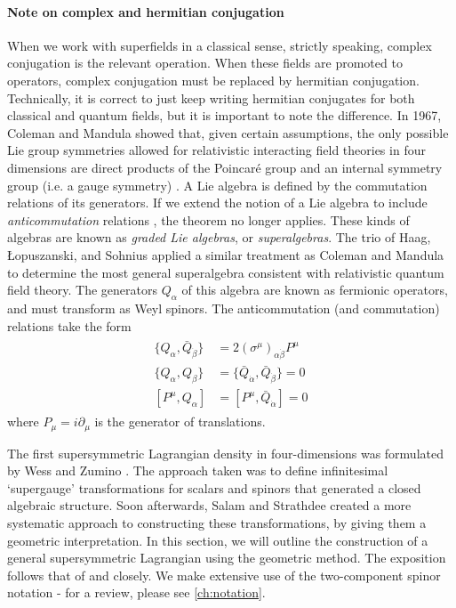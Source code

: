 \paragraph{Note on complex and hermitian conjugation} When we work with superfields in a classical sense, strictly speaking, complex conjugation is the relevant operation. When these fields are promoted to operators, complex conjugation must be replaced by hermitian conjugation. Technically, it is correct to just keep writing hermitian conjugates for both classical and quantum fields, but it is important to note the difference.
In 1967, Coleman and Mandula \citep{Coleman1967} showed that, given certain assumptions, the only possible Lie group symmetries allowed for relativistic interacting field theories in four dimensions are direct products of the Poincar\'e group and an internal symmetry group (i.e. a gauge symmetry) \citep{Mandula2015}.
A Lie algebra is defined by the commutation relations of its generators. If we extend the notion of a Lie algebra to include \emph{anticommutation} relations \citep{Wess1992}, the theorem no longer applies. These kinds of algebras are known as \emph{graded Lie algebras}, or \emph{superalgebras}. The trio of Haag, Łopuszanski, and Sohnius \citep{Haag1975} applied a similar treatment as Coleman and Mandula to determine the most general superalgebra consistent with relativistic quantum field theory. The generators $Q_\alpha$ of this algebra are known as fermionic operators, and must transform as Weyl spinors. The anticommutation (and commutation) relations take the form
\begin{align}
  \begin{split}
  \{Q_\alpha, \bar{Q}_{\dot{\beta}}\} &= 2(\sigma^\mu)_{\alpha\dot{\beta}}P^\mu\\
  \{Q_\alpha, Q_\beta\} &= \{\bar{Q}_{\dot{\alpha}}, \bar{Q}_{\dot{\beta}}\} = 0\\
  [P^\mu,Q_\alpha] &= [P^\mu,\bar{Q}_{\dot{\alpha}}] = 0
\end{split}
\label{eq:susy_algebra}
\end{align}
where $P_\mu = i\partial_\mu$ is the generator of translations. 

The first supersymmetric Lagrangian density in four-dimensions was formulated by Wess and Zumino \citep{Wess1974}. The approach taken was to define infinitesimal `supergauge' transformations for scalars and spinors that generated a closed algebraic structure. Soon afterwards, Salam and Strathdee \citep{Salam1974} created a more systematic approach to constructing these transformations, by giving them a geometric interpretation. In this section, we will outline the construction of a general supersymmetric Lagrangian using the geometric method. The exposition follows that of \citep{Zee2010} and \citep{Martin1997} closely. We make extensive use of the two-component spinor notation - for a review, please see \autoref{ch:notation}.

